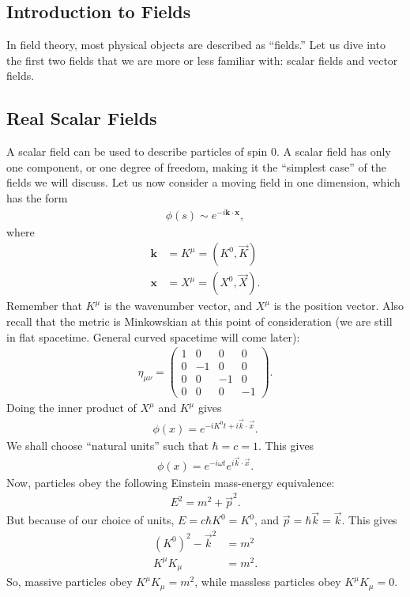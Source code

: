 \documentclass[a4paper,11pt]{article}
\numberwithin{equation}{section}
\theoremstyle{definition}
\begin{document}
\subsection{Introduction to Fields}
In field theory, most physical objects are described as ``fields.'' Let us dive into the first two fields that we are more or less familiar with: scalar fields and vector fields. 

\subsection{Real Scalar Fields}
A scalar field can be used to describe particles of spin 0. A scalar field has only one component, or one degree of freedom, making it the ``simplest case'' of the fields we will discuss. Let us now consider a moving field in one dimension, which has the form
\begin{align*}
\phi(s) \sim e^{-i\mathbf{k}\cdot\mathbf{x}},
\end{align*}
where
\begin{align*}
\mathbf{k} &= K^\mu = (K^0, \vec{K})\\
\mathbf{x} &= X^\mu = (X^0, \vec{X}).
\end{align*}
Remember that $K^\mu$ is the wavenumber vector, and $X^\mu$ is the position vector. Also recall that the metric is Minkowskian at this point of consideration (we are still in flat spacetime. General curved spacetime will come later):
\begin{align*}
\eta_{\mu\nu} = \begin{pmatrix}
1 & 0 & 0 & 0\\
0 & -1 & 0 & 0\\
0 & 0 & -1 & 0\\
0 & 0 & 0 & -1
\end{pmatrix}.
\end{align*} 
Doing the inner product of $X^\mu$ and $K^\mu$ gives
\begin{align*}
\phi(x) = e^{-iK^0t + i\vec{k}\cdot\vec{x}}.
\end{align*}
We shall choose ``natural units'' such that $\hbar = c = 1$. This gives
\begin{align*}
\phi(x) = e^{-i\omega t}e^{i\vec{k}\cdot\vec{x}}.
\end{align*}
Now, particles obey the following Einstein mass-energy equivalence:
\begin{align*}
E^2 = m^2 + \vec{p}^2.
\end{align*}
But because of our choice of units, $E = c\hbar K^0= K^0$, and $\vec{p} = \hbar \vec{k} = \vec{k}$. This gives
\begin{align*}
\left( K^0\right)^2 - \vec{k}^2 &= m^2\\
K^\mu K_\mu &= m^2.
\end{align*}
So, massive particles obey $K^\mu K_\mu = m^2$, while massless particles obey $K^\mu K_\mu = 0$. \\
\end{document}
